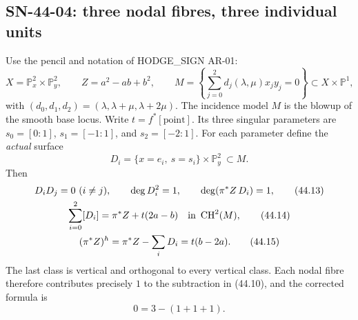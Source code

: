 \documentclass[11pt,a4paper]{article}
\theoremstyle{definition}
\theoremstyle{remark}
\begin{document}
\subsection{SN-44-04: three nodal fibres, three individual units}
\label{sn:44-04}

Use the pencil and notation of HODGE\_SIGN AR-01:
\[
 X=\mathbb P^2_x\times\mathbb P^2_y,\qquad
 Z=a^2-ab+b^2,\qquad
 M=\left\{\sum_{j=0}^2 d_j(\lambda,\mu)x_jy_j=0\right\}
       \subset X\times\mathbb P^1,
\]
with $(d_0,d_1,d_2)=(\lambda,\lambda+\mu,\lambda+2\mu)$.
The incidence model $M$ is the blowup of the smooth base locus.
Write $t=f^*[\mathrm{point}]$.  Its three singular parameters are
$s_0=[0:1]$, $s_1=[-1:1]$, and $s_2=[-2:1]$.  For each parameter
define the \emph{actual} surface
\[
 D_i=\{x=e_i,\ s=s_i\}\times\mathbb P^2_y\ \subset M.
 \tag{44.12}
\]
Then
\begin{gather}
 D_iD_j=0\ (i\ne j),\qquad \deg D_i^2=1,\qquad
 \deg(\pi^*Z\,D_i)=1,                                    \tag{44.13}\\
 \sum_{i=0}^2[D_i]=\pi^*Z+t(2a-b)
          \quad\hbox{in }\operatorname{CH}^2(M),           \tag{44.14}\\
 (\pi^*Z)^h=\pi^*Z-\sum_iD_i=t(b-2a).                    \tag{44.15}
\end{gather}
The last class is vertical and orthogonal to every vertical class.
Each nodal fibre therefore contributes precisely $1$ to the
subtraction in (44.10), and the corrected formula is
\[
 \boxed{\qquad 0=3-(1+1+1).\qquad}                       \tag{44.16}
\]
\end{document}
